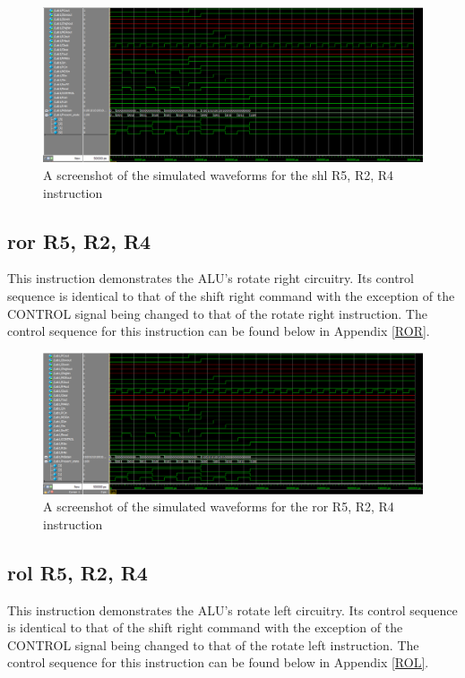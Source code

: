 \documentclass{article}
\begin{document}
    \begin{figure}[h!]
        \begin{center}
            \includegraphics[width=13cm]{shl}
            \caption{A screenshot of the simulated waveforms for the shl R5, R2, R4 instruction}
        \end{center}
    \end{figure}

    \subsection{ror R5, R2, R4}
    This instruction demonstrates the ALU's rotate right circuitry. Its control sequence is identical to that of the shift right command with the exception of the CONTROL signal being changed to that of the rotate right instruction. The control sequence for this instruction can be found below in Appendix \ref{ROR}.

    \begin{figure}[h!]
        \begin{center}
            \includegraphics[width=13cm]{ror}
            \caption{A screenshot of the simulated waveforms for the ror R5, R2, R4 instruction}
        \end{center}
    \end{figure}

    \subsection{rol R5, R2, R4}
    This instruction demonstrates the ALU's rotate left circuitry. Its control sequence is identical to that of the shift right command with the exception of the CONTROL signal being changed to that of the rotate left instruction. The control sequence for this instruction can be found below in Appendix \ref{ROL}.
\end{document}
